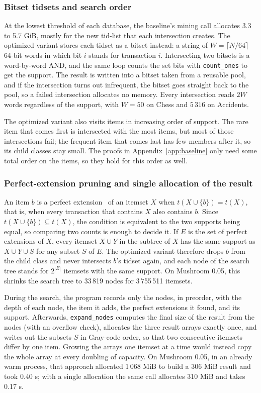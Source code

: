 \subsubsection{Bitset tidsets and search order}
At the lowest threshold of each database, the baseline's mining call allocates 3.3 to
5.7 GiB, mostly for the new tid-list that each intersection creates. The optimized variant
stores each tidset as a bitset instead: a string of $W = \lceil N/64 \rceil$ 64-bit words
in which bit $i$ stands for transaction $i$. Intersecting two bitsets is a word-by-word
AND, and the same loop counts the set bits with \texttt{count\_ones} to get the support.
The result is written into a bitset taken from a reusable pool, and if the intersection
turns out infrequent, the bitset goes straight back to the pool, so a failed intersection
allocates no memory. Every intersection reads $2W$ words regardless of the support, with
$W = 50$ on Chess and $5\,316$ on Accidents.

The optimized variant also visits items in increasing order of support. The rare item
that comes first is intersected with the most items, but most of those intersections
fail; the frequent item that comes last has few members after it, so its child classes
stay small. The proofs in Appendix~\ref{app:baseline} only need some total order on the
items, so they hold for this order as well.

\subsubsection{Perfect-extension pruning and single allocation of the result}
An item $b$ is a perfect extension~\cite{borgelt2012} of an itemset $X$ when
$t(X \cup \{b\}) = t(X)$, that is, when every transaction that contains $X$ also contains
$b$. Since $t(X \cup \{b\}) \subseteq t(X)$, the condition is equivalent to the two
supports being equal, so comparing two counts is enough to decide it. If $E$ is the set of
perfect extensions of $X$, every itemset $X \cup Y$ in the subtree of $X$ has the same
support as $X \cup Y \cup S$ for any subset $S$ of $E$. The optimized variant therefore
drops $b$ from the child class and never intersects $b$'s tidset again, and each node of
the search tree stands for $2^{|E|}$ itemsets with the same support. On Mushroom 0.05,
this shrinks the search tree to 33\,819 nodes for 3\,755\,511 itemsets.

During the search, the program records only the nodes, in preorder, with the depth of
each node, the item it adds, the perfect extensions it found, and its support. Afterwards,
\texttt{expand\_nodes} computes the final size of the result from the nodes (with an
overflow check), allocates the three result arrays exactly once, and writes out the
subsets $S$ in Gray-code order, so that two consecutive itemsets differ by one item.
Growing the arrays one itemset at a time would instead copy the whole array at every
doubling of capacity. On Mushroom 0.05, in an already warm process, that approach
allocated 1\,068 MiB to build a 306 MiB result and took 0.40 s; with a single allocation
the same call allocates 310 MiB and takes 0.17 s.

